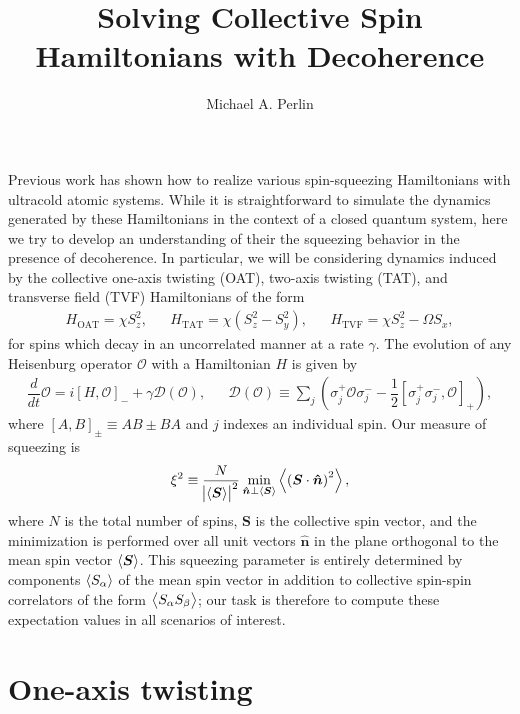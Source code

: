 \documentclass[aps,notitlepage,nofootinbib,11pt]{revtex4-1}
\renewcommand{\t}{\text} %
\newcommand{\f}[2]{\dfrac{#1}{#2}} %
\newcommand{\p}[1]{\left(#1\right)} %
\renewcommand{\sp}[1]{\left[#1\right]} %
\renewcommand{\v}{\bm} %
\newcommand{\uv}[1]{\v{\hat{#1}}} %
\renewcommand{\c}{\cdot} %
\newcommand{\bk}{\Braket} %
\newcommand{\D}{\mathcal{D}}
\renewcommand{\O}{\mathcal{O}}
\newcommand{\1}{\mathds{1}}
\begin{document}
\title{Solving Collective Spin Hamiltonians with Decoherence}

\author{Michael A. Perlin}

\maketitle

Previous work has shown how to realize various spin-squeezing
Hamiltonians with ultracold atomic systems.  While it is
straightforward to simulate the dynamics generated by these
Hamiltonians in the context of a closed quantum system, here we try to
develop an understanding of their the squeezing behavior in the
presence of decoherence.  In particular, we will be considering
dynamics induced by the collective one-axis twisting (OAT), two-axis
twisting (TAT), and transverse field (TVF) Hamiltonians of the form
\begin{align}
  H_{\t{OAT}} = \chi S_z^2,
  &&
  H_{\t{TAT}} = \chi \p{S_z^2 - S_y^2},
  &&
  H_{\t{TVF}} = \chi S_z^2 - \Omega S_x,
\end{align}
for spins which decay in an uncorrelated manner at a rate $\gamma$.
The evolution of any Heisenburg operator $\O$ with a Hamiltonian $H$
is given by
\begin{align}
  \f{d}{dt} \O
  = i\sp{H,\O}_- + \gamma\D\p{\O},
  &&
  \D\p{\O} \equiv \sum_j\p{\sigma_j^+\O\sigma_j^-
    - \f12\sp{\sigma_j^+\sigma_j^-,\O}_+},
  \label{eq:EOM}
\end{align}
where $\sp{A,B}_\pm\equiv AB\pm BA$ and $j$ indexes an individual
spin.  Our measure of squeezing is
\begin{align}
  \xi^2 \equiv \f{N}{\abs{\bk{\v S}}^2}
  \min_{\uv n\perp\bk{\v S}} \bk{\p{\v S\c\uv n}^2},
  \label{eq:squeezing}
\end{align}
where $N$ is the total number of spins, $\v S$ is the collective spin
vector, and the minimization is performed over all unit vectors
$\uv n$ in the plane orthogonal to the mean spin vector $\bk{\v S}$.
This squeezing parameter is entirely determined by components
$\bk{S_\alpha}$ of the mean spin vector in addition to collective
spin-spin correlators of the form $\bk{S_\alpha S_\beta}$; our task is
therefore to compute these expectation values in all scenarios of
interest.


\section{One-axis twisting}
\end{document}
